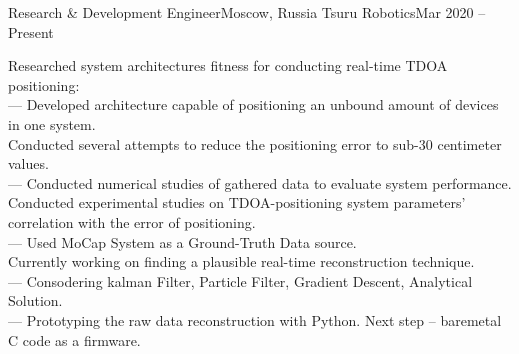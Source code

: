 \resumeSubheading
  {Research \& Development Engineer}{Moscow, Russia}
  {Tsuru Robotics}{Mar 2020 -- Present}
  \begin{itemize}[leftmargin=0in, label={}]
    \small{\item{
      {Researched system architectures fitness for conducting real-time TDOA positioning:}\\
      {— Developed architecture capable of positioning an unbound amount of devices in one system.}\\
      {Conducted several attempts to reduce the positioning error to sub-30 centimeter values.}\\
      {— Conducted numerical studies of gathered data to evaluate system performance.}\\
      {Conducted experimental studies on TDOA-positioning system parameters' correlation with the error of positioning.}\\
      {— Used MoCap System as a Ground-Truth Data source.}\\
      {Currently working on finding a plausible real-time reconstruction technique.}\\
      {— Consodering kalman Filter, Particle Filter, Gradient Descent, Analytical Solution.}\\
      {— Prototyping the raw data reconstruction with Python. Next step -- baremetal C code as a firmware.}\\
    }}
   \end{itemize}